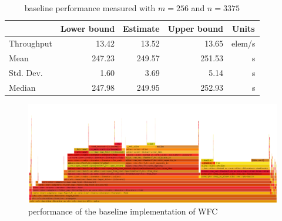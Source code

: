 \documentclass[shortabstract, english, inz]{iithesis}
\begin{document}
\begin{table}[]
\centering
\begin{tabular}{@{}l|r|r|r|r|@{}}
\cmidrule(l){2-5}
                                 & \multicolumn{1}{c|}{Lower bound} & \multicolumn{1}{c|}{Estimate} & \multicolumn{1}{c|}{Upper bound} & \multicolumn{1}{c|}{Units} \\ \midrule
\multicolumn{1}{|l|}{Throughput} & 13.42                            & 13.52                         & 13.65                            & elem/s                     \\ \midrule
\multicolumn{1}{|l|}{Mean}       & 247.23                           & 249.57                        & 251.53                           & s                          \\ \midrule
\multicolumn{1}{|l|}{Std. Dev.}  & 1.60                             & 3.69                          & 5.14                             & s                          \\ \midrule
\multicolumn{1}{|l|}{Median}     & 247.98                           & 249.95                        & 252.93                           & s                          \\ \bottomrule
\end{tabular}
\caption{baseline performance measured with \(m=256\) and \(n=3375\)}
\label{table:baseline}
\end{table}

\begin{figure}[H]
\centering
\includegraphics[width=1\textwidth, angle=0]{images/baseline_flamegraph.png}
\caption{performance of the baseline implementation of WFC}
\label{fig:baseline_flamegraph}
\end{figure}
\end{document}
